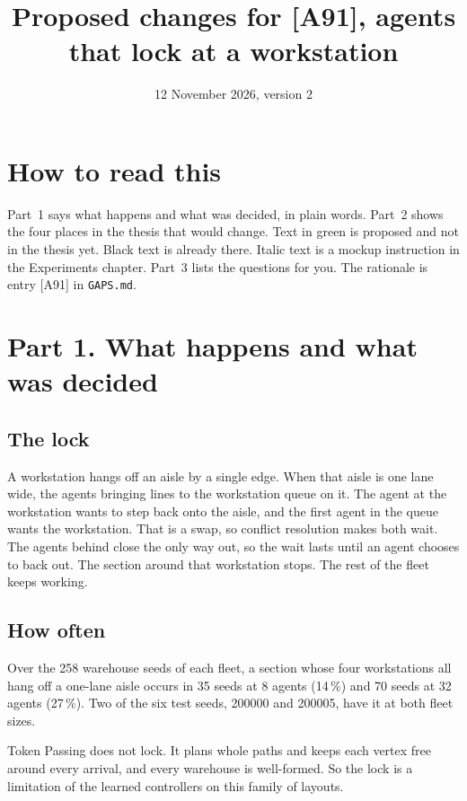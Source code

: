 \documentclass[11pt,a4paper]{article}
\title{Proposed changes for [A91], agents that lock at a workstation}
\date{12 November 2026, version 2}
\newcommand{\new}[1]{\textcolor{newc}{#1}}
\begin{document}
\maketitle

\section*{How to read this}
Part~1 says what happens and what was decided, in plain words. Part~2 shows
the four places in the thesis that would change. Text in \new{green} is
proposed and not in the thesis yet. Black text is already there. Italic text
is a mockup instruction in the Experiments chapter. Part~3 lists the
questions for you. The rationale is entry [A91] in \texttt{GAPS.md}.

\section*{Part 1. What happens and what was decided}

\subsection*{The lock}
A workstation hangs off an aisle by a single edge. When that aisle is one
lane wide, the agents bringing lines to the workstation queue on it. The
agent at the workstation wants to step back onto the aisle, and the first
agent in the queue wants the workstation. That is a swap, so conflict
resolution makes both wait. The agents behind close the only way out, so the
wait lasts until an agent chooses to back out. The section around that
workstation stops. The rest of the fleet keeps working.

\subsection*{How often}
Over the 258 warehouse seeds of each fleet, a section whose four workstations
all hang off a one-lane aisle occurs in 35 seeds at 8 agents (14\,\%) and 70
seeds at 32 agents (27\,\%). Two of the six test seeds, 200000 and 200005,
have it at both fleet sizes.

Token Passing does not lock. It plans whole paths and keeps each vertex free
around every arrival, and every warehouse is well-formed. So the lock is a
limitation of the learned controllers on this family of layouts.
\end{document}
